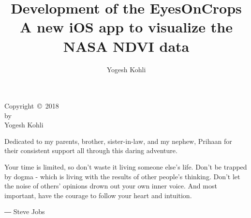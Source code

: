 \documentclass{sdsu-thesis}
\author{Yogesh Kohli}
\title{Development of the EyesOnCrops \\
A new iOS app to visualize the NASA NDVI data}
\theoremstyle{dtm}
\begin{document}
\maketitle

\makesignature

\begin{copyrightpage}
  Copyright~\copyright~2018 \\
  by \\
  Yogesh Kohli
\end{copyrightpage}

% 
\begin{dedication}
  \vspace{3in}
  \centering
  Dedicated to my parents, brother, sister-in-law, and my nephew, Prihaan for their consistent support all through this daring adventure.
\end{dedication}

% 
\begin{epigraph}
Your time is limited, so don't waste it living someone else's life. Don't be trapped by dogma - which is living with the results of other people's thinking. Don't let the noise of others' opinions drown out your own inner voice. And most important, have the courage to follow your heart and intuition.
\begin{center}
    ― Steve Jobs
\end{center}
\end{epigraph}

\begin{abstract}
  
\end{abstract}

\tableofcontents

\listoffigures
\end{document}
